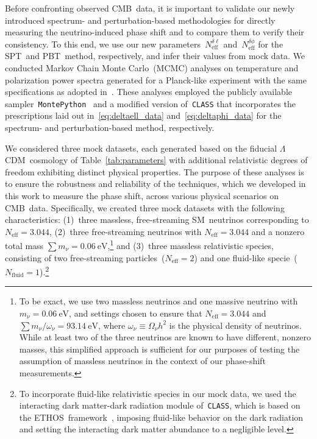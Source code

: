 \documentclass[11pt]{article}
\numberwithin{equation}{section}
\newcommand{\Neff}{N_\mathrm{eff}}
\newcommand{\Nphase}{N_\mathrm{eff}^{\delta\phi}}
\newcommand{\Nmultipole}{N_\mathrm{eff}^{\delta\ell}}
\begin{document}
Before confronting observed CMB~data, it is important to validate our newly introduced spectrum- and perturbation-based methodologies for directly measuring the neutrino-induced phase shift and to compare them to verify their consistency. To this end, we use our new parameters~$\Nmultipole$ and~$\Nphase$ for the SPT~and PBT~method, respectively, and infer their values from mock data. We conducted Markov Chain Monte Carlo~(MCMC) analyses on temperature and polarization power spectra generated for a Planck-like experiment with the same specifications as adopted in~\cite{Allison:2015qca}. These analyses employed the publicly available sampler~\texttt{MontePython}~\cite{Audren:2012wb, Brinckmann:2018cvx} and a modified version of~\texttt{CLASS} that incorporates the prescriptions laid out in~\eqref{eq:deltaell_data} and~\eqref{eq:deltaphi_data} for the spectrum- and perturbation-based method, respectively.\medskip

We considered three mock datasets, each generated based on the fiducial $\Lambda$CDM~cosmology of Table~\ref{tab:parameters} with additional relativistic degrees of freedom exhibiting distinct physical properties. The purpose of these analyses is to ensure the robustness and reliability of the techniques, which we developed in this work to measure the phase shift, across various physical scenarios on CMB~data. Specifically, we created three mock datasets with the following characteristics: (1)~three massless, free-streaming SM~neutrinos corresponding to $\Neff = 3.044$, (2)~three free-streaming neutrinos with $\Neff = 3.044$ and a nonzero total mass $\sum m_\nu = \SI{0.06}{\electronvolt}$,\footnote{To be exact, we use two massless neutrinos and one massive neutrino with $m_\nu = \SI{0.06}{\electronvolt}$, and settings chosen to ensure that $\Neff = 3.044$ and $\sum m_\nu /\omega_\nu = \SI{93.14}{\electronvolt}$, where $\omega_\nu \equiv \Omega_\nu h^2$ is the physical density of neutrinos. While at least two of the three neutrinos are known to have different, nonzero masses, this simplified approach is sufficient for our purposes of testing the assumption of massless neutrinos in the context of our phase-shift measurements.} and (3)~three massless relativistic species, consisting of two free-streaming particles~($\Neff = 2$) and one fluid-like specie~\mbox{($N_\mathrm{fluid} = 1$)}.\footnote{To incorporate fluid-like relativistic species in our mock data, we used the interacting dark matter-dark radiation module of~\texttt{CLASS}, which is based on the ETHOS~framework~\cite{Cyr-Racine:2015ihg}, imposing fluid-like behavior on the dark radiation and setting the interacting dark matter abundance to a negligible level.}
\end{document}
